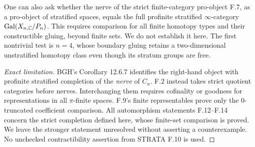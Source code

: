 One can also ask whether the nerve of the strict finite-category pro-object F.7, as a pro-object of stratified spaces, equals the full profinite stratified $\infty$-category $\operatorname{Gal}(X_{n,\mathbb C}/P_n)$. This requires comparison for all finite homotopy types and their constructible gluing, beyond finite sets. We do not establish it here. The first nontrivial test is $n=4$, whose boundary gluing retains a two-dimensional unstratified homotopy class even though its stratum groups are free.
\begin{proof}[Exact limitation]
BGH's Corollary 12.6.7 identifies the right-hand object with profinite stratified completion of the \emph{nerve} of $C_n$. F.2 instead takes strict quotient categories before nerves. Interchanging them requires cofinality or goodness for representations in all $\pi$-finite spaces. F.9's finite representables prove only the $0$-truncated coefficient comparison. All automorphism statements F.12--F.14 concern the strict completion defined here, whose finite-set comparison is proved. We leave the stronger statement unresolved without asserting a counterexample. No unchecked contractibility assertion from STRATA F.10 is used.
\end{proof}

